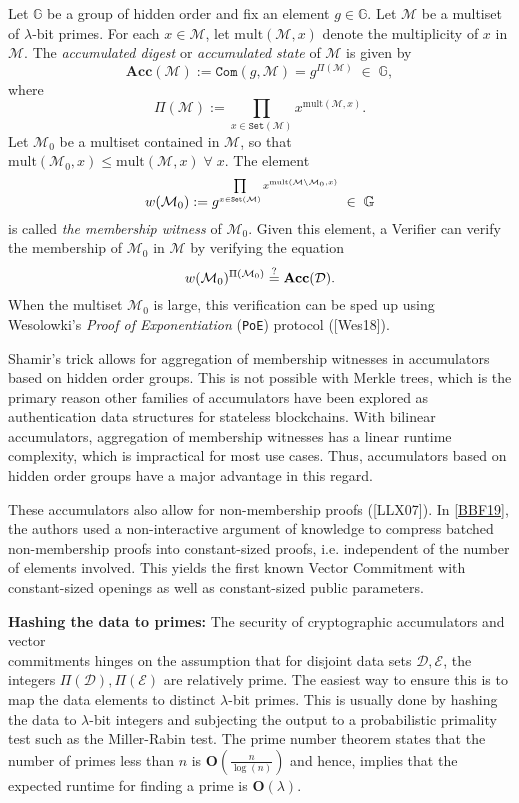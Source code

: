 \documentclass[11pt, lettersize, notitlepage, leqno, footskip=0.6cm]{article}
\newcommand{\pl}{\prod\limits}
\newcommand{\ttt}{\texttt}
\newcommand{\bG}{\mathbb{G}}
\newcommand{\Acc}{\mbf{Acc}}
\newcommand{\sett}{\ttt{Set}}
\newcommand{\mult}{\mr{mult}}
\newcommand{\mc}{\mathcal}
\newcommand{\mb}{\mathbb}
\newcommand{\mbf}{\mathbf}
\newcommand{\mr}{\mathrm}
\newcommand{\sm}{\setminus}
\newcommand{\lam}{\lambda}
\newcommand{\mcM}{\mc{M}}
\newcommand{\vs}{\vspace{-0.15cm}}
\newcommand{\noin}{\noindent}
\newcommand{\sta}{\stackrel{?}{=}}
\numberwithin{equation}{section}
\begin{document}
Let $\mb{G}$ be a group of hidden order and fix an element $g \in\mb{G}$. Let $\mc{M}$ be a multiset of $\lam$-bit primes. For each $x\in \mc{M}$, let $\mult(\mc{M},x)$ denote the multiplicity of $x$ in $\mcM$. The \textit{accumulated digest} or \textit{accumulated state} of $\mc{M}$ is given by \vs $$\Acc(\mc{M}):= \ttt{Com}(g,\mcM) =   g^{\Pi(\mc{M})} \;\in\;\bG,$$ where $$\Pi(\mc{M}) := \pl_{x\in \sett(\mc{M})} x^{\mult(\mc{M},x)} .$$ Let $\mc{M}_0$ be a multiset contained in $\mc{M}$, so that  $\mult(\mc{M}_0,x)\leq \mult(\mc{M},x)\;\forall\;x$. The element \vs $$w(\mc{M}_0):= g^{\pl_{x\in \sett(\mc{M})} x^{\mult(\mc{M}\sm \mc{M}_0 ,x)}}\;\in\;\mb{G} \vs $$ is called \textit{the membership witness} of $\mc{M}_0$. Given this element, a Verifier can verify the membership of $\mc{M}_0$ in $\mc{M}$ by verifying the equation \vspace{-0.2cm} $$w(\mc{M}_0)^{\Pi(\mc{M}_0)} \sta \Acc(\mc{D}). \vs $$ When the multiset $\mc{M}_0$ is large, this verification can be sped up using Wesolowki's \textit{Proof of Exponentiation} (\verb|PoE|) protocol ([Wes18]).

Shamir's trick allows for aggregation of membership witnesses in accumulators based on hidden order groups. This is not possible with Merkle trees, which is the primary reason other families of accumulators have been explored as authentication data structures for stateless blockchains. With bilinear accumulators, aggregation of membership witnesses has a linear runtime complexity, which is impractical for most use cases. Thus, accumulators based on hidden order groups have a major advantage in this regard.

These accumulators also allow for non-membership proofs ([LLX07]). In \hyperlink{BBF19}{[BBF19]}, the authors used a non-interactive argument of knowledge to compress batched non-membership proofs into constant-sized proofs, i.e. independent of the number of elements involved. This yields the first known Vector Commitment with constant-sized openings as well as  constant-sized public parameters.\vspace{0.15cm}

\noin \textbf{Hashing the data to primes:} The security of cryptographic accumulators and vector\\ commitments hinges on the assumption that for disjoint data sets $\mc{D},\mc{E}$, the integers $\Pi(\mc{D}), \Pi(\mc{E})$ are relatively prime. The easiest way to ensure this is to map the data elements to distinct $\lam$-bit primes. This is usually done by hashing the data to $\lam$-bit integers and subjecting the output to a probabilistic primality test such as the Miller-Rabin test. The prime number theorem states that the number of primes less than $n$ is $\mbf{O}(\frac{n}{\log(n)})$ and hence, implies that the expected runtime for finding a prime is $\mbf{O}(\lam)$.
\end{document}
